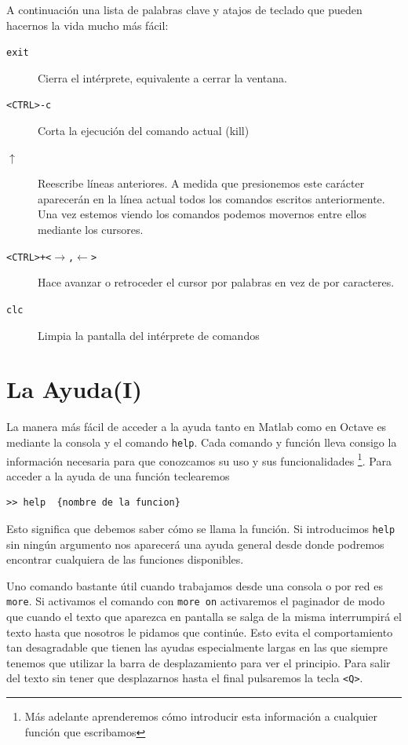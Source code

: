 A continuación una lista de palabras clave y atajos de teclado que
pueden hacernos la vida mucho más fácil:

\begin{description}
\item [\texttt{exit}]Cierra el intérprete, equivalente a cerrar la
  ventana.
\item [\texttt{<CTRL>-c}]Corta la ejecución del comando actual (kill)
\item [$\uparrow$]Reescribe líneas anteriores. A medida que
  presionemos este carácter aparecerán en la línea actual todos los
  comandos escritos anteriormente. Una vez estemos viendo los comandos
  podemos movernos entre ellos mediante los cursores.
\item [\texttt{<CTRL>+<$\rightarrow$,$\leftarrow$>}]Hace avanzar o
  retroceder el cursor por palabras en vez de por caracteres.
\item [\texttt{clc}]Limpia la pantalla del intérprete de comandos
\end{description}

\section{La Ayuda(I)}

La manera más fácil de acceder a la ayuda tanto en Matlab como en
Octave es mediante la consola y el comando \texttt{help}.
Cada comando y función lleva consigo la información necesaria para que
conozcamos su uso y sus funcionalidades%
\footnote{Más adelante aprenderemos cómo introducir esta información a
  cualquier función que escribamos%
}. Para acceder a la ayuda de una función teclearemos

\begin{lstlisting}
>> help  {nombre de la funcion}
\end{lstlisting}

Esto significa que debemos saber cómo se llama la función. Si
introducimos \texttt{help} sin ningún argumento nos aparecerá una
ayuda general desde donde podremos encontrar cualquiera de las
funciones disponibles.

Uno comando bastante útil cuando trabajamos desde una consola o por
red es \texttt{more}. Si activamos el comando con
\texttt{more on} activaremos el paginador de modo que cuando el texto
que aparezca en pantalla se salga de la misma interrumpirá el texto
hasta que nosotros le pidamos que continúe. Esto evita el
comportamiento tan desagradable que tienen las ayudas especialmente
largas en las que siempre tenemos que utilizar la barra de
desplazamiento para ver el principio. Para salir del texto sin tener
que desplazarnos hasta el final pulsaremos la tecla \texttt{<Q>}.


